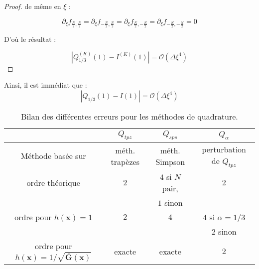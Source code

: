 \begin{proof}
de même en $\xi$ :

\begin{equation}
\partial_{\xi} f_{\frac{N}{2},\frac{N}{2}} = \partial_{\xi} f_{-\frac{N}{2},\frac{N}{2}} = \partial_{\xi} f_{\frac{N}{2},-\frac{N}{2}} = \partial_{\xi} f_{-\frac{N}{2},-\frac{N}{2}} = 0 
\end{equation}

D'où le résultat :

\begin{equation}
|Q_{1/3}^{(K)}(1) - I^{(K)}(1) | = \mathcal{O}\left( \Delta \xi^4 \right)
\end{equation}

\end{proof}

\begin{corollaire}
Ainsi, il est immédiat que :
\begin{equation}
|Q_{1/3}(1) - I(1) | = \mathcal{O}\left( \Delta \xi^4 \right)
\end{equation}
\end{corollaire}

















\begin{table}[ht]
\begin{center}
\begin{tabular}{c||c|c|c}
    & $Q_{tpz}$ & $Q_{sps}$ & $Q_{\alpha}$ \\
\hline
\hline
Méthode basée sur & méth. trapèzes & méth. Simpson & perturbation de $Q_{tpz}$ \\
\hline
ordre théorique & $2$ & $4$ si $N$ pair, & $2$ \\
                &     &      $1$ sinon   &     \\
\hline
ordre pour $h(\mathbf{x})=1$ &  $2$ & $4$ & $4$ si $\alpha=1/3$ \\
                             &      &     & $2$ sinon    \\
\hline
ordre pour $h(\mathbf{x})=1/\sqrt{\overline{\mathbf{G}}(\mathbf{x})}$ &  exacte & exacte & $2$
\end{tabular}
\end{center}
\caption{Bilan des différentes erreurs pour les méthodes de quadrature.}
\end{table}























